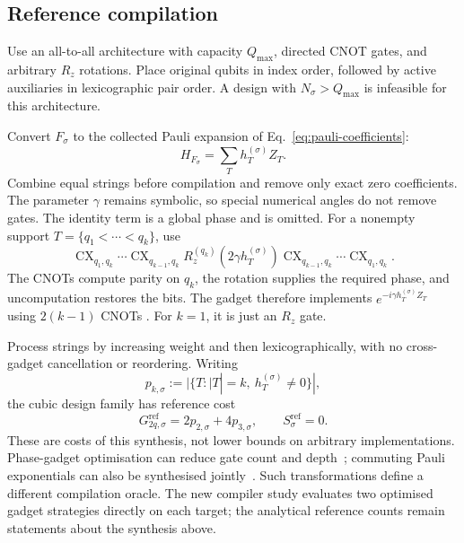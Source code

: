 \documentclass[a4paper,onecolumn,11pt,unpublished]{quantumarticle}
\theoremstyle{remark}
\begin{document}
\subsection{Reference compilation}
\label{app:reference-compiler}

Use an all-to-all architecture with capacity $Q_{\max}$, directed CNOT gates,
and arbitrary $R_z$ rotations.  Place original qubits in index order, followed
by active auxiliaries in lexicographic pair order.  A design with
$N_\sigma>Q_{\max}$ is infeasible for this architecture.

Convert $F_\sigma$ to the collected Pauli expansion of
Eq.~\eqref{eq:pauli-coefficients}:
\begin{equation}
H_{F_\sigma}=\sum_T h_T^{(\sigma)}Z_T.
\label{eq:reference-collected-hamiltonian}
\end{equation}
Combine equal strings before compilation and remove only exact zero
coefficients.  The parameter $\gamma$ remains symbolic, so special numerical
angles do not remove gates.  The identity term is a global phase and is omitted.
For a nonempty support $T=\{q_1<\cdots<q_k\}$, use
\begin{equation}
\operatorname{CX}_{q_1,q_k}\cdots\operatorname{CX}_{q_{k-1},q_k}
R_z^{(q_k)}(2\gamma h_T^{(\sigma)})
\operatorname{CX}_{q_{k-1},q_k}\cdots\operatorname{CX}_{q_1,q_k}.
\label{eq:reference-parity-gadget}
\end{equation}
The CNOTs compute parity on $q_k$, the rotation supplies the required phase,
and uncomputation restores the bits.  The gadget therefore implements
$e^{-i\gamma h_T^{(\sigma)}Z_T}$ using $2(k-1)$ CNOTs
\cite{CampbellDahl2022,Verchere2023}.  For $k=1$, it is just an $R_z$ gate.

Process strings by increasing weight and then lexicographically, with no
cross-gadget cancellation or reordering.  Writing
\begin{equation}
p_{k,\sigma}:=|\{T:|T|=k,\ h_T^{(\sigma)}\neq0\}|,
\label{eq:reference-pauli-count}
\end{equation}
the cubic design family has reference cost
\begin{equation}
G_{2q,\sigma}^{\mathrm{ref}}=2p_{2,\sigma}+4p_{3,\sigma},
\qquad S_\sigma^{\mathrm{ref}}=0.
\label{eq:reference-gate-count}
\end{equation}
These are costs of this synthesis, not lower bounds on arbitrary implementations.
Phase-gadget optimisation can reduce gate count and depth~\cite{CowtanPhase2020};
commuting Pauli exponentials can also be synthesised jointly~\cite{CowtanUCC2020}.
Such transformations define a different compilation oracle. The new compiler
study evaluates two optimised gadget strategies directly on each target;
the analytical reference counts remain statements about the synthesis above.
\end{document}
